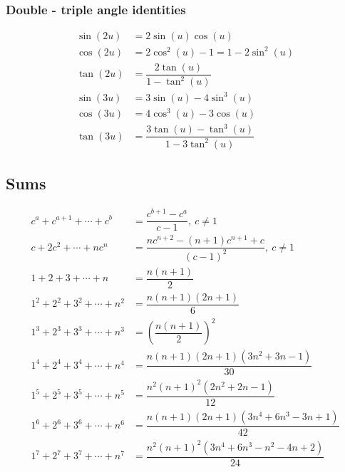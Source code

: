 \subsubsection{Double - triple angle identities}
\vspace{-0.6cm}
\begin{align*}
	\sin(2u) &= 2\sin(u)\cos(u) \\ 
	\cos(2u) &= 2\cos^2(u) - 1 = 1 - 2\sin^2(u) \\
	\tan(2u) &= \dfrac{2\tan(u)}{1-\tan^2(u)} \\ 
	\sin(3u) &= 3\sin(u) - 4\sin^3(u) \\ 
	\cos(3u) &= 4\cos^3(u) - 3\cos(u) \\ 
	\tan(3u) &= \dfrac{3\tan(u) - \tan^3(u)}{1 - 3\tan^2(u)}
\end{align*}

\subsection{Sums}
\vspace{-0.6cm}
\begin{align*}
	c^{a} + c^{a + 1} + \cdots + c^{b} &= \dfrac{c^{b + 1} - c^{a}}{c - 1},\ c \neq 1 \\
	c + 2c^{2} + \cdots + nc^{n} &= \dfrac{nc^{n + 2} - (n + 1)c^{n + 1} + c}{(c - 1)^2},\ c \neq 1 \\
	1 + 2 + 3 + \cdots + n &= \dfrac{n(n + 1)}{2} \\
	1^2 + 2^2 + 3^2 + \cdots + n^2 &= \dfrac{n(n + 1)(2n + 1)}{6} \\ 
	1^3 + 2^3 + 3^3 + \cdots + n^3 &= \left(\dfrac{n(n + 1)}{2}\right)^2 \\ 
	1^4 + 2^4 + 3^4 + \cdots + n^4 &= \dfrac{n(n + 1)(2n + 1)(3n^2 + 3n - 1)}{30} \\
	1^5 + 2^5 + 3^5 + \cdots + n^5 &= \dfrac{n^2(n + 1)^2(2n^2 + 2n - 1)}{12} \\
	1^6 + 2^6 + 3^6 + \cdots + n^6 &= \dfrac{n(n + 1)(2n + 1)(3n^4 + 6n^3 - 3n + 1)}{42} \\
	1^7 + 2^7 + 3^7 + \cdots + n^7 &= \dfrac{n^2(n + 1)^2(3n^4 + 6n^3 - n^2 - 4n + 2)}{24}
\end{align*}


